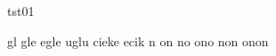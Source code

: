 \documentclass[a4paper, wide, 12pt]{mwart}
\begin{document}
\huge tst01

{\fonta gl gle egle uglu
cieke ecik
n on no ono non onon }
\end{document}
